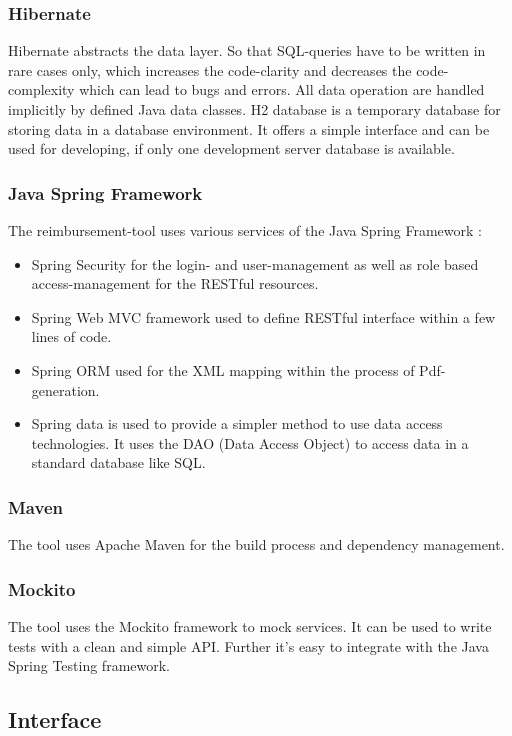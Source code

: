 \subsubsection{Hibernate}
Hibernate abstracts the data layer. So that SQL-queries have to be written in rare cases only, which increases the code-clarity and decreases the code-complexity which can lead to bugs and errors. All data operation are handled implicitly by defined Java data classes.\newline
H2 database is a temporary database for storing data in a database environment. It offers a simple interface and can be used for developing, if only one development server database is available. \cite{hibernate}

\subsubsection{Java Spring Framework}
The reimbursement-tool uses various services of the Java Spring Framework \cite{spring}:
\begin{itemize}
    \item Spring Security for the login- and user-management as well as role based access-management for the RESTful resources.
    \item Spring Web MVC framework used to define RESTful interface within a few lines of code.
    \item Spring ORM used for the XML mapping within the process of Pdf-generation.
    \item Spring data is used to provide a simpler method to use data access technologies. It uses the DAO (Data Access Object) \cite{dao} to access data in a standard database like SQL. 
\end{itemize}

\subsubsection{Maven}
The tool uses Apache Maven \cite{maven} for the build process and dependency management.  

\subsubsection{Mockito}
The tool uses the Mockito framework to mock services. It can be used to write tests with a clean and simple API. Further it's easy to integrate with the Java Spring Testing framework. \cite{mockito}

\subsection{Interface}

